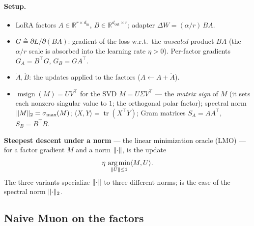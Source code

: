 \documentclass[11pt]{article}
\newcommand{\R}{\mathbb{R}}
\DeclareMathOperator*{\argmin}{arg\,min}
\newcommand{\smax}{\sigma_{\max}}
\DeclarePairedDelimiter{\norm}{\lVert}{\rVert}
\newcommand{\DW}{\Delta W}
\DeclareMathOperator{\polar}{msign}          %
\theoremstyle{plain}
\theoremstyle{definition}
\theoremstyle{remark}
\begin{document}
\paragraph{Setup.}
\begin{itemize}[leftmargin=1.5em,itemsep=1pt,topsep=2pt]
  \item LoRA factors $A\in\R^{r\times d_{\mathrm{in}}}$, $B\in\R^{d_{\mathrm{out}}\times r}$; adapter $\DW=(\alpha/r)\,BA$.
  \item $G\triangleq\partial L/\partial(BA)$: gradient of the loss w.r.t.\ the \emph{unscaled} product $BA$ (the $\alpha/r$ scale is absorbed into the learning rate $\eta>0$). Per-factor gradients $G_A=B^\top G$, $G_B=GA^\top$.
  \item $\dot A,\dot B$: the updates applied to the factors ($A\leftarrow A+\dot A$).
  \item $\polar(M)=UV^\top$ for the SVD $M=U\Sigma V^\top$ --- the \emph{matrix sign} of $M$ (it sets each nonzero singular value to $1$; the orthogonal polar factor); spectral norm $\norm{M}_2=\smax(M)$; $\langle X,Y\rangle=\operatorname{tr}(X^\top Y)$; Gram matrices $S_A=AA^\top$, $S_B=B^\top B$.
\end{itemize}
\textbf{Steepest descent under a norm} --- the linear minimization oracle (LMO) --- for a factor gradient $M$ and a norm $\norm{\cdot}$, is the update
\begin{equation}
  \eta\,\argmin_{\norm{U}\le1}\langle M,U\rangle .
  \label{eq:lmo}
\end{equation}
The three variants specialize $\norm{\cdot}$ to three different norms;  is the case of the spectral norm $\norm{\cdot}_2$.

\subsection{Naive Muon on the factors}
\label{sec:method-naive}
\end{document}
